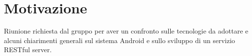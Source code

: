 \documentclass[../template.tex]{subfiles}
\begin{document}
\section{Motivazione}
Riunione richiesta dal gruppo per aver un confronto sulle tecnologie da adottare e alcuni chiarimenti generali sul sistema Android e sullo sviluppo di un servizio RESTful server.
\end{document}
